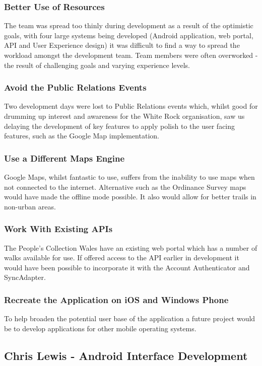 \documentclass[11pt,a4paper]{report}
\begin{document}
\subsubsection{Better Use of Resources}
The team was spread too thinly during development as a result of the optimistic goals, with four large systems being developed (Android application, web portal, API and User Experience design) it was difficult to find a way to spread the workload amongst the development team. Team members were often overworked - the result of challenging goals and varying experience levels.

\subsubsection{Avoid the Public Relations Events}
Two development days were lost to Public Relations events which, whilst good for drumming up interest and awareness for the White Rock organisation, saw us delaying the development of key features to apply polish to the user facing features, such as the Google Map implementation. 

\subsubsection{Use a Different Maps Engine}
Google Maps, whilst fantastic to use, suffers from the inability to use maps when not connected to the internet. Alternative such as the Ordinance Survey maps would have made the offline mode possible. It also would allow for better trails in non-urban areas.

\subsubsection{Work With Existing APIs}
The People's Collection Wales have an existing web portal which has a number of walks available for use. If offered access to the API earlier in development it would have been possible to incorporate it with the Account Authenticator and SyncAdapter.

\subsubsection{Recreate the Application on iOS and Windows Phone}
To help broaden the potential user base of the application a future project would be to develop applications for other mobile operating systems.

\subsection{Chris Lewis - Android Interface Development}
\end{document}
